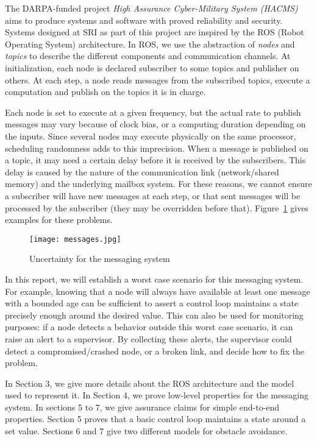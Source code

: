 The DARPA-funded project \emph{High Assurance Cyber-Military System (HACMS)} aims to produce systems and software with proved reliability and security.
Systems designed at SRI as part of this project are inspired by the ROS (Robot Operating System) architecture.
In ROS, we use the abstraction of \textit{nodes} and \textit{topics} to describe the different components and communication channels. 
At initialization, each node is declared subscriber to some topics and publisher on others. At each step, a node reads messages from the subscribed topics, execute a computation and publish on the topics it is in charge.

Each node is set to execute at a given frequency, but the actual rate to publish messages may vary because of clock bias, or a computing duration depending on the inputs. Since several nodes may execute physically on the same processor, scheduling randomness adds to this imprecision. 
When a message is published on a topic, it may need a certain delay before it is received by the subscribers. This delay is caused by the nature of the communication link (network/shared memory) and the underlying mailbox system.
For these reasons, we cannot ensure a subscriber will have new messages at each step, or that sent messages will be processed by the subscriber (they may be overridden before that).
Figure~\ref{msg} gives examples for these problems.

\begin{figure}[h]
\begin{center}
\texttt{[image: messages.jpg]}
\caption{Uncertainty for the messaging system}\label{msg}
\end{center}
\end{figure}


In this report, we will establish a worst case scenario for this messaging system. For example, knowing that a node will always have available at least one message with a bounded age can be sufficient to assert a control loop maintains a state precisely enough around the desired value.
This can also be used for monitoring purposes: if a node detects a behavior outside this worst case scenario, it can raise an alert to a supervisor. By collecting these alerts, the supervisor could detect a compromised/crashed node, or a broken link, and decide how to fix the problem.

In Section 3, we give more details about the ROS architecture and the model used to represent it. In Section 4, we prove low-level properties for the messaging system. In sections 5 to 7, we give assurance claims for simple end-to-end properties. Section 5 proves that a basic control loop maintains a state around a set value. Sections 6 and 7 give two different models for obstacle avoidance.